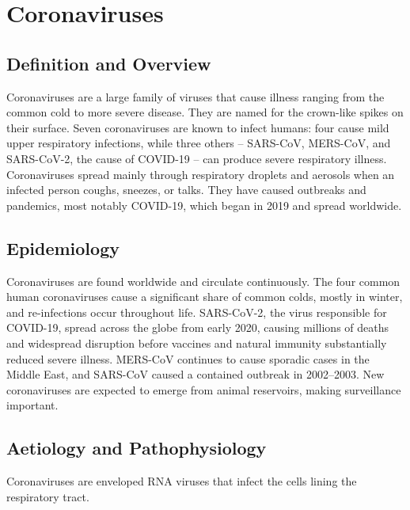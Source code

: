 \chapter{Coronaviruses}

\section*{Definition and Overview}
Coronaviruses are a large family of viruses that cause illness ranging from the common cold to more severe disease. They are named for the crown-like spikes on their surface. Seven coronaviruses are known to infect humans: four cause mild upper respiratory infections, while three others -- SARS-CoV, MERS-CoV, and SARS-CoV-2, the cause of COVID-19 -- can produce severe respiratory illness. Coronaviruses spread mainly through respiratory droplets and aerosols when an infected person coughs, sneezes, or talks. They have caused outbreaks and pandemics, most notably COVID-19, which began in 2019 and spread worldwide.

\section*{Epidemiology}
Coronaviruses are found worldwide and circulate continuously. The four common human coronaviruses cause a significant share of common colds, mostly in winter, and re-infections occur throughout life. SARS-CoV-2, the virus responsible for COVID-19, spread across the globe from early 2020, causing millions of deaths and widespread disruption before vaccines and natural immunity substantially reduced severe illness. MERS-CoV continues to cause sporadic cases in the Middle East, and SARS-CoV caused a contained outbreak in 2002--2003. New coronaviruses are expected to emerge from animal reservoirs, making surveillance important.

\section*{Aetiology and Pathophysiology}
Coronaviruses are enveloped RNA viruses that infect the cells lining the respiratory tract.

